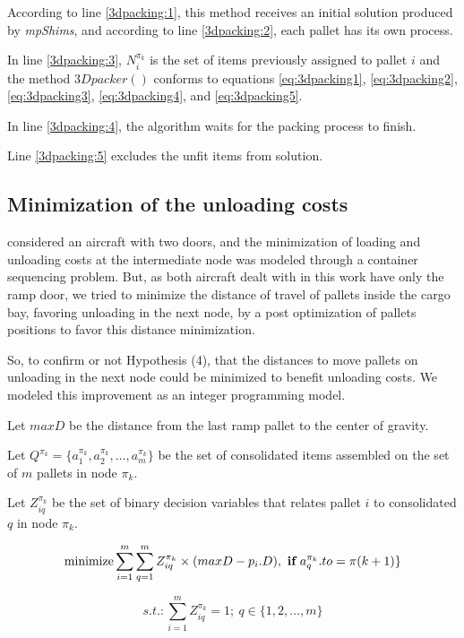\documentclass[preprint,authoryear]{elsarticle}
\begin{document}
According to line \ref{3dpacking:1}, this method receives an initial solution produced by {\it mpShims}, and according to line \ref{3dpacking:2}, each pallet has its own process.

In line \ref{3dpacking:3}, $N^{\pi_k}_i$ is the set of items previously assigned to pallet $i$ and the method $3Dpacker()$ conforms to equations \ref{eq:3dpacking1}, \ref{eq:3dpacking2}, \ref{eq:3dpacking3}, \ref{eq:3dpacking4}, and \ref{eq:3dpacking5}.

In line \ref{3dpacking:4}, the algorithm waits for the packing process to finish.

Line \ref{3dpacking:5} excludes the unfit items from solution.


\subsection{Minimization of the unloading costs}

\cite{LurkinSchyns2015} considered an aircraft with two doors, and the minimization of loading and unloading costs at the intermediate node was modeled through a container sequencing problem. But, as both aircraft dealt with in this work have only the ramp door, we tried to minimize the distance of travel of pallets inside the cargo bay, favoring unloading in the next node, by a post optimization of pallets positions to favor this distance minimization.

So, to confirm or not Hypothesis (4), that the distances to move pallets on unloading in the next node could be minimized to benefit unloading costs. We modeled this improvement as an integer programming model.

Let $maxD$ be the distance from the last ramp pallet to the center of gravity.

Let $Q^{\pi_k}  = \{ a^{\pi_k}_1, a^{\pi_k}_2, \ldots, a^{\pi_k}_m \}$ be the set of consolidated items assembled on the set of $m$ pallets in node $\pi_k$.

Let $Z^{\pi_k}_{iq}$ be the set of binary decision variables that relates pallet $i$ to consolidated $q$ in node $\pi_k$.

\begin{equation} \label{eq:distobj}
	\mbox{minimize} \sum_{i=1}^m \sum_{q=1}^m Z^{\pi_k}_{iq} \times ( maxD - p_i.D) ,\ \mbox{{\bf if}}\ a^{\pi_k}_q.to = \pi(k+1) \}
\end{equation}

\begin{equation} \label{eq:distcons}
	s.t.: \sum_{i=1}^m Z^{\pi_k}_{iq} = 1;\ q \in \{1,2,\ldots,m\}
\end{equation}
\end{document}
